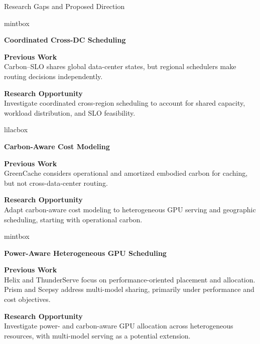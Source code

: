 \documentclass[aspectratio=169,10pt]{beamer}
\newcommand{\gapcard}[4]{\begin{beamercolorbox}[wd=\linewidth,rounded=true,sep=.075cm]{#1}\setlength{\fboxsep}{3pt}%
\begin{minipage}[t]{.165\linewidth}\raggedright\small\bfseries\color{Accent}#2\end{minipage}\hfill\begin{minipage}[t]{.40\linewidth}\raggedright\footnotesize{\bfseries\color{Muted}Previous Work}\\[1pt]#3\end{minipage}\hfill\colorbox{Paper}{\begin{minipage}[t]{.375\linewidth}\raggedright\footnotesize{\bfseries\color{Accent}Research Opportunity}\\[1pt]#4\end{minipage}}\end{beamercolorbox}\par}
\begin{document}
\begin{frame}[t,label=ACCOUNT]{Research Gaps and Proposed Direction}
\vspace{-.05cm}
\gapcard{mintbox}{Coordinated Cross-DC Scheduling}{Carbon--SLO shares global data-center states, but regional schedulers make routing decisions independently.}{Investigate coordinated cross-region scheduling to account for shared capacity, workload distribution, and SLO feasibility.}
\vspace{.14cm}
\gapcard{lilacbox}{Carbon-Aware Cost Modeling}{GreenCache considers operational and amortized embodied carbon for caching, but not cross-data-center routing.}{Adapt carbon-aware cost modeling to heterogeneous GPU serving and geographic scheduling, starting with operational carbon.}
\vspace{.14cm}
\gapcard{mintbox}{Power-Aware Heterogeneous GPU Scheduling}{Helix and ThunderServe focus on performance-oriented placement and allocation. Prism and Scepsy address multi-model sharing, primarily under performance and cost objectives.}{Investigate power- and carbon-aware GPU allocation across heterogeneous resources, with multi-model serving as a potential extension.}
\end{frame}
\end{document}
